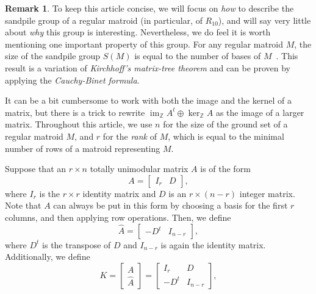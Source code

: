 \documentclass[12p]{amsart}
\numberwithin{equation}{section}
\theoremstyle{plain}
\theoremstyle{definition}
\newtheorem{remark}[thm]{Remark}
\newcommand{\Z}{\mathbb {Z}}
\DeclareMathOperator{\im}{im}
\begin{document}
\begin{remark}\label{rem:mtt}
    To keep this article concise, we will focus on \emph{how} to describe the sandpile group of a regular matroid (in particular, of $R_{10}$), and will say very little about \emph{why} this group is interesting. Nevertheless, we do feel it is worth mentioning one important property of this group. For any regular matroid $M$, the size of the sandpile group $S(M)$ is equal to the number of bases of $M$~\cite[Theorem 3.3.2]{Merino}. This result is a variation of \emph{Kirchhoff's matrix-tree theorem} and can be proven by applying the \emph{Cauchy-Binet formula}. 
\end{remark}

It can be a bit cumbersome to work with both the image and the kernel of a matrix, but there is a trick to rewrite $\im_ {\Z} A^t\oplus \ker_ {\Z} A$ as the image of a larger matrix. Throughout this article, we use $n$ for the size of the ground set of a regular matroid $M$, and $r$ for the \emph{rank} of $M$, which is equal to the minimal number of rows of a matroid representing $M$.

Suppose that an $r \times n$ totally unimodular matrix $A$ is of the form \begin{equation}\label{eq:stand_form} A = \begin{bmatrix} I_r & D\end{bmatrix},\end{equation}
where $I_r$ is the $r\times r$ identity matrix and $D$ is an $r \times (n-r)$ integer matrix. Note that $A$ can always be put in this form by choosing a basis for the first $r$ columns, and then applying row operations. Then, we define \begin{equation}\label{eq:dual_form}\widehat A = \begin{bmatrix} -D^t & I_{n-r}\end{bmatrix},\end{equation} where $D^t$ is the transpose of $D$ and $I_{n-r}$ is again the identity matrix. Additionally, we define \begin{equation}\label{eq:combo_form}K = \begin{bmatrix} A \\ \widehat A \end{bmatrix} = \begin{bmatrix}I_r & D \\-D^t & I_{n-r}\end{bmatrix},\end{equation}
\end{document}
